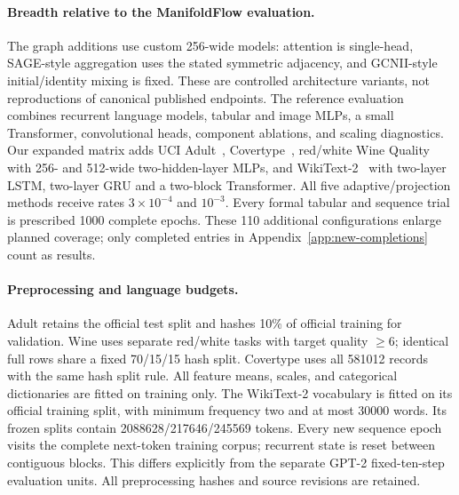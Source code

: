 \paragraph{Breadth relative to the ManifoldFlow evaluation.}
The graph additions use custom 256-wide models: attention is single-head, SAGE-style aggregation uses the stated symmetric adjacency, and GCNII-style initial/identity mixing is fixed. These are controlled architecture variants, not reproductions of canonical published endpoints. The reference evaluation combines recurrent language models, tabular and image MLPs, a small Transformer, convolutional heads, component ablations, and scaling diagnostics. Our expanded matrix adds UCI Adult~\citep{uciAdult1996}, Covertype~\citep{uciCovertype1998}, red/white Wine Quality~\citep{uciWine2009} with 256- and 512-wide two-hidden-layer MLPs, and WikiText-2~\citep{merity2016pointer} with two-layer LSTM, two-layer GRU and a two-block Transformer. All five adaptive/projection methods receive rates $3\times10^{-4}$ and $10^{-3}$. Every formal tabular and sequence trial is prescribed 1000 complete epochs. These 110 additional configurations enlarge planned coverage; only completed entries in Appendix~\ref{app:new-completions} count as results.
\paragraph{Preprocessing and language budgets.}
Adult retains the official test split and hashes 10\% of official training for validation. Wine uses separate red/white tasks with target quality $\ge6$; identical full rows share a fixed 70/15/15 hash split. Covertype uses all 581012 records with the same hash split rule. All feature means, scales, and categorical dictionaries are fitted on training only. The WikiText-2 vocabulary is fitted on its official training split, with minimum frequency two and at most 30000 words. Its frozen splits contain 2088628/217646/245569 tokens. Every new sequence epoch visits the complete next-token training corpus; recurrent state is reset between contiguous blocks. This differs explicitly from the separate GPT-2 fixed-ten-step evaluation units. All preprocessing hashes and source revisions are retained.
